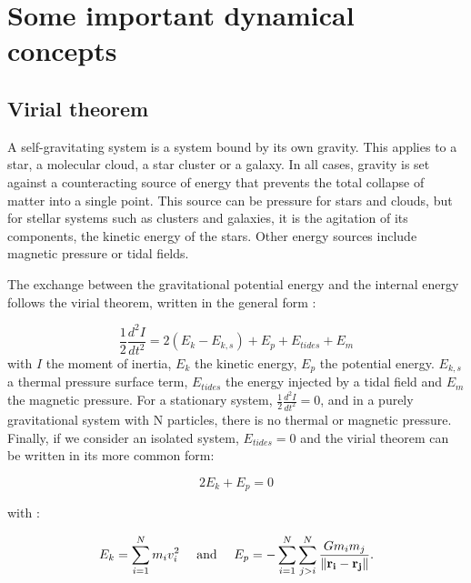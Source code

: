%


\section{Some important dynamical concepts}


\subsection{Virial theorem}

A self-gravitating system is a system bound by its own gravity. This applies to a star, a molecular cloud, a star cluster or a galaxy. In all cases, gravity is set against a counteracting source of energy that prevents the total collapse of matter into a single point. This source can be pressure for stars and clouds, but for stellar systems such as clusters and galaxies, it is the agitation of its components, the kinetic energy of the stars. Other energy sources include magnetic pressure or tidal fields.

The exchange between the gravitational potential energy and the internal energy follows the virial theorem, written in the general form \citep{McKee2007,BT}:

\begin{equation}
\frac{1}{2} \frac{d^2 I}{dt^2} = 2 ( E_k - E_{k,s}) +  E_p + E_{tides} + E_m
\end{equation}
with $I$ the moment of inertia, $E_k$ the kinetic energy, $E_p$ the potential energy. $E_{k,s}$  a thermal pressure surface term, $E_{tides}$ the energy injected by a tidal field and $E_m$ the magnetic pressure. For a stationary system, $\frac{1}{2} \frac{d^2 I}{dt^2} = 0$, and in a purely gravitational system with N particles, there is no thermal or magnetic pressure. Finally, if we consider an isolated system, $E_{tides}=0$ and the virial theorem can be written in its more common form:

\begin{equation}
2 E_k + E_p = 0
\end{equation}

with :

\begin{equation}
 E_k = \sum_{i=1}^N m_i v_i^2 ~~~~\textrm{and}~~~~ E_p = - \sum_{i=1}^N \sum_{j>i}^N \frac{G m_i m_j}{\| \bold{r_i} - \bold{r_j}\| } .
\end{equation}

